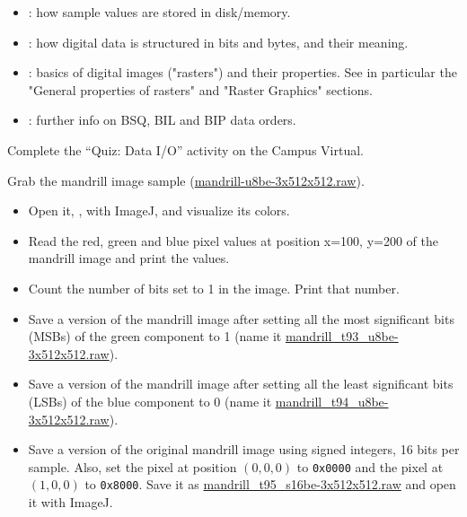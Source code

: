 \begin{itemize}
    \item \cite{chua_data_representation}: how sample values are stored in disk/memory.
    \item \cite{siegfried_bytes}: how digital data is structured in bits and bytes, and their meaning.
    \item \cite{collins_understanding_rasters}: basics of digital images ("rasters") and their properties.
        See in particular the "General properties of rasters" and "Raster Graphics" sections.
    \item \cite{loc_bsq,loc_bil,loc_bip}: further info on BSQ, BIL and BIP data orders.
\end{itemize}

\begin{exercise}
Complete the ``Quiz: Data I/O'' activity on the Campus Virtual.
\end{exercise}


\begin{exercise}
Grab the mandrill image sample (\url{mandrill-u8be-3x512x512.raw}).
\begin{itemize}
    \item Open it, \eg, with ImageJ, and visualize its colors.
    \item Read the red, green and blue pixel values at position x=100, y=200 of the mandrill image
    and print the values.
    \item Count the number of bits set to 1 in the image. Print that number.

    \item Save a version of the mandrill image after setting all the most significant bits (MSBs)
          of the green component to 1 (name it \url{mandrill_t93_u8be-3x512x512.raw}).
    \item Save a version of the mandrill image after setting all the least significant bits (LSBs)
          of the blue component to 0 (name it \url{mandrill_t94_u8be-3x512x512.raw}).
    \item Save a version of the original mandrill image using signed integers,
          16 bits per sample. Also, set the pixel at position $(0,0,0)$ to \texttt{0x0000} and
          the pixel at $(1,0,0)$ to \texttt{0x8000}. Save it as \url{mandrill_t95_s16be-3x512x512.raw}
          and open it with ImageJ.
\end{itemize}
\end{exercise}


%
%
%
